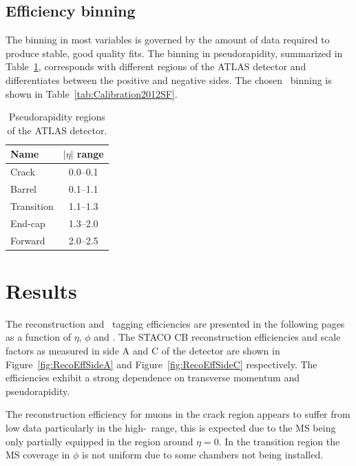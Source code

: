 \subsection{Efficiency binning}
The binning in most variables is governed by the amount of data required to produce stable, good quality fits. The binning in pseudorapidity, summarized in Table~\ref{tab:CalibrationEtaRegions}, corresponds with different regions of the ATLAS detector and differentiates between the positive and negative sides. The chosen \pt\ binning is shown in Table~\ref{tab:Calibration2012SF}.

\begin{table}[thbp]
  \centering
  \begin{tabular}{@{}lc@{}}
    \toprule
    Name       & $|\eta|$ range \\
    \midrule
    Crack      & \numrange{0.0}{0.1} \\
    Barrel     & \numrange{0.1}{1.1} \\
    Transition & \numrange{1.1}{1.3} \\
    End-cap    & \numrange{1.3}{2.0} \\
    Forward    & \numrange{2.0}{2.5} \\
    \bottomrule
  \end{tabular}
  \caption{Pseudorapidity regions of the ATLAS detector.}\label{tab:CalibrationEtaRegions}
\end{table}

\section{Results}

The reconstruction and \xsm\ tagging efficiencies are presented in the following pages as a function of $\eta$, $\phi$ and \pt. The STACO CB reconstruction efficiencies and scale factors as measured in side A and C of the detector are shown in Figure~\ref{fig:RecoEffSideA} and Figure~\ref{fig:RecoEffSideC} respectively. The efficiencies exhibit a strong dependence on transverse momentum and pseudorapidity.

The reconstruction efficiency for muons in the crack region appears to suffer from low data particularly in the high-\pt\ range, this is expected due to the MS being only partially equipped in the region around $\eta=0$. In the transition region the MS coverage in $\phi$ is not uniform due to some chambers not being installed.

